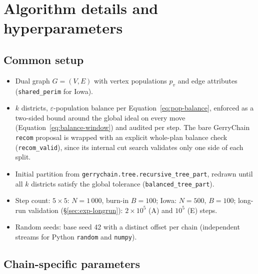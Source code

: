 \documentclass[11pt]{article}
\begin{document}
\section{Algorithm details and hyperparameters}\label{app:hyperparams}

\subsection{Common setup}\label{app:common}

\begin{itemize}
  \item Dual graph $G = (V, E)$ with vertex populations $p_v$ and
    edge attributes (\texttt{shared\_perim} for Iowa).
  \item $k$ districts, $\varepsilon$-population balance per
    Equation~\eqref{eq:pop-balance}, enforced as a two-sided bound around the
    global ideal on every move (Equation~\eqref{eq:balance-window})
    and audited per step. The bare GerryChain \texttt{recom} proposal
    is wrapped with an explicit whole-plan balance check
    (\texttt{recom\_valid}), since its internal cut search validates
    only one side of each split.
  \item Initial partition from
    \texttt{gerrychain.tree.recursive\_tree\_part}, redrawn until all
    $k$ districts satisfy the global tolerance
    (\texttt{balanced\_tree\_part}).
  \item Step count: $5 \times 5$: $N = 1\,000$, burn-in $B = 100$;
    Iowa: $N = 500$, $B = 100$; long-run validation
    (\S\ref{sec:exp-longrun}): $2 \times 10^5$ (A) and
    $10^5$ (E) steps.
  \item Random seeds: base seed 42 with a distinct offset per chain
    (independent streams for Python \texttt{random} and
    \texttt{numpy}).
\end{itemize}

\subsection{Chain-specific parameters}\label{app:chains}
\end{document}
